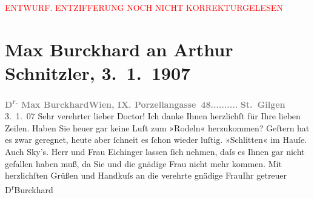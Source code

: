 
\begin{center}
            \textcolor{red}{ENTWURF. ENTZIFFERUNG NOCH NICHT KORREKTURGELESEN}
                      \end{center}
            
               \section[Max Burckhard an Arthur Schnitzler, 3. 1. 1907]{ Max Burckhard an Arthur Schnitzler, 3. 1. 1907}\nopagebreak{}\rehead{ }\begin{ledgroupsized}[t]{13cm}\normalsize\beginnumbering{} \toendnotes[C]{\smallbreak\pagebreak[2]} 
\toendnotes[C]{\smallbreak}\pstart
           \noindent{}{\pb}\textcolor{gray}{\textbf{D\textsuperscript{r.} Max Burckhard}}\hfill \textcolor{gray}{\textbf{Wien, IX. Porzellangasse 48..........}}\pend
           \pstart
           \raggedleft{}\textcolor{gray}{\textbf{St. Gilgen}}{ }3. 1. 07\pend
           \pstart{}Sehr verehrter lieber Doctor!\pend\pstart
           Ich danke Ihnen herzlichſt für Ihre lieben Zeilen. Haben Sie heuer gar keine Luſt
                    zum »Rodeln« herzukommen? Geſtern hat es zwar geregnet, heute aber ſchneit es
                    ſchon wieder luſtig. »Schlitten« im Hauſe. Auch Sky’s. Herr und Frau Eichinger lassen ſich \label{T_L01648_1v}\label{T_L01648_1h} nehmen, daſs es Ihnen gar {\pb}nicht gefallen haben muß, da Sie und
                    die gnädige Frau nicht mehr kommen.\pend
           \pstart
           Mit herzlichſten Grüßen und Handkuſs an die verehrte gnädige Frau\hspace*{1.5em}Ihr\pend
           \pstart getreuer \spacefill\mbox{D\textsuperscript{r}Burckhard}\pend{}\endnumbering{}\end{ledgroupsized}  \newcommand{\dateiname}{L01648}\newcommand{\titel}{Max Burckhard an Arthur Schnitzler, 3. 1. 1907}\newcommand{\editorInnen}{Martin Anton Müller und Gerd-Hermann Susen}
      